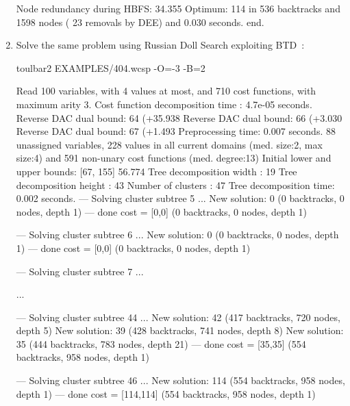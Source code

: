 \begin{enumerate}
{\begin{DoxyCode}
Node redundancy during HBFS: 34.355 %
Optimum: 114 in 536 backtracks and 1598 nodes ( 23 removals by DEE) and 0.030 seconds.
end.
\end{DoxyCode}}
\item Solve the same problem using Russian Doll Search exploiting BTD~\cite{Sanchez09a}:
\begin{DoxyCode}
	toulbar2 EXAMPLES/404.wcsp -O=-3 -B=2
\end{DoxyCode}
{\scriptsize
\begin{DoxyCode}
Read 100 variables, with 4 values at most, and 710 cost functions, with maximum arity 3.
Cost function decomposition time : 4.7e-05 seconds.
Reverse DAC dual bound: 64 (+35.938%
Reverse DAC dual bound: 66 (+3.030%
Reverse DAC dual bound: 67 (+1.493%
Preprocessing time: 0.007 seconds.
88 unassigned variables, 228 values in all current domains (med. size:2, max size:4) and 591 non-unary cost functions (med. degree:13)
Initial lower and upper bounds: [67, 155] 56.774%
Tree decomposition width  : 19
Tree decomposition height : 43
Number of clusters        : 47
Tree decomposition time: 0.002 seconds.
--- Solving cluster subtree 5 ...
New solution: 0 (0 backtracks, 0 nodes, depth 1)
---  done  cost = [0,0] (0 backtracks, 0 nodes, depth 1)

--- Solving cluster subtree 6 ...
New solution: 0 (0 backtracks, 0 nodes, depth 1)
---  done  cost = [0,0] (0 backtracks, 0 nodes, depth 1)

--- Solving cluster subtree 7 ...

...

--- Solving cluster subtree 44 ...
New solution: 42 (417 backtracks, 720 nodes, depth 5)
New solution: 39 (428 backtracks, 741 nodes, depth 8)
New solution: 35 (444 backtracks, 783 nodes, depth 21)
---  done  cost = [35,35] (554 backtracks, 958 nodes, depth 1)

--- Solving cluster subtree 46 ...
New solution: 114 (554 backtracks, 958 nodes, depth 1)
---  done  cost = [114,114] (554 backtracks, 958 nodes, depth 1)


\end{DoxyCode}}
\end{enumerate}
